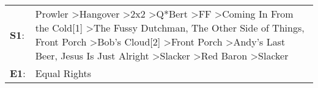 \begin{supertabular}{p{0.03\textwidth}p{0.92\textwidth}}
 \textbf{S1}:  &  Prowler\textsuperscript{} \textgreater \enspace Hangover\textsuperscript{} \textgreater \enspace 2x2\textsuperscript{} \textgreater \enspace Q*Bert\textsuperscript{} \textgreater \enspace FF\textsuperscript{} \textgreater \enspace Coming In From the Cold[1]\textsuperscript{} \textgreater \enspace The Fussy Dutchman\textsuperscript{}, \enspace The Other Side of Things\textsuperscript{}, \enspace Front Porch\textsuperscript{} \textgreater \enspace Bob's Cloud[2]\textsuperscript{} \textgreater \enspace Front Porch\textsuperscript{} \textgreater \enspace Andy's Last Beer\textsuperscript{}, \enspace Jesus Is Just Alright\textsuperscript{} \textgreater \enspace Slacker\textsuperscript{} \textgreater \enspace Red Baron\textsuperscript{} \textgreater \enspace Slacker\textsuperscript{}  \enspace  \\
 \textbf{E1}:  &                                                                                                                                                                                                                                                                                                                                                                                                                                                                                                                                                                                                                                                                                                                                                                                       Equal Rights\textsuperscript{}  \enspace  \\
\end{supertabular}
